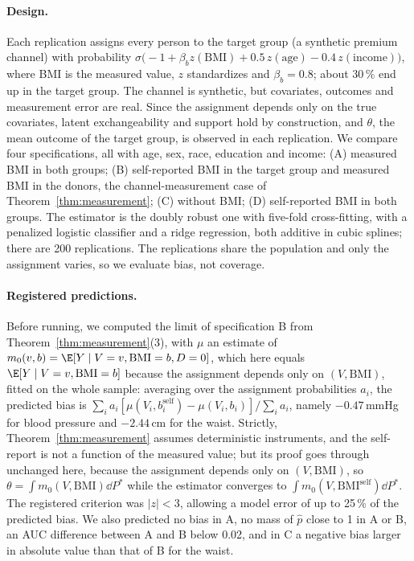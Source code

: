 \paragraph{Design.} Each replication assigns every person to the target group (a synthetic premium channel) with probability $\sigma\bigl(-1+\beta_b z(\mathrm{BMI})+0.5\,z(\mathrm{age})-0.4\,z(\mathrm{income})\bigr)$, where BMI is the measured value, $z$ standardizes and $\beta_b=0.8$; about 30\,\% end up in the target group. The channel is synthetic, but covariates, outcomes and measurement error are real. Since the assignment depends only on the true covariates, latent exchangeability and support hold by construction, and $\theta$, the mean outcome of the target group, is observed in each replication. We compare four specifications, all with age, sex, race, education and income: (A) measured BMI in both groups; (B) self-reported BMI in the target group and measured BMI in the donors, the channel-measurement case of Theorem~\ref{thm:measurement}; (C) without BMI; (D) self-reported BMI in both groups. The estimator is the doubly robust one with five-fold cross-fitting, with a penalized logistic classifier and a ridge regression, both additive in cubic splines; there are 200 replications. The replications share the population and only the assignment varies, so we evaluate bias, not coverage.

\paragraph{Registered predictions.} Before running, we computed the limit of specification B from Theorem~\ref{thm:measurement}(3), with $\mu$ an estimate of $m_0(v,b)=\E[Y\mid V=v,\mathrm{BMI}=b,D=0]$, which here equals $\E[Y\mid V=v,\mathrm{BMI}=b]$ because the assignment depends only on $(V,\mathrm{BMI})$, fitted on the whole sample: averaging over the assignment probabilities $a_i$, the predicted bias is $\sum_ia_i[\mu(V_i,b_i^{\mathrm{self}})-\mu(V_i,b_i)]/\sum_ia_i$, namely $-0.47$\,mmHg for blood pressure and $-2.44$\,cm for the waist. Strictly, Theorem~\ref{thm:measurement} assumes deterministic instruments, and the self-report is not a function of the measured value; but its proof goes through unchanged here, because the assignment depends only on $(V,\mathrm{BMI})$, so $\theta=\int m_0(V,\mathrm{BMI})\dd P^*$ while the estimator converges to $\int m_0(V,\mathrm{BMI}^{\mathrm{self}})\dd P^*$. The registered criterion was $|z|<3$, allowing a model error of up to 25\,\% of the predicted bias. We also predicted no bias in A, no mass of $\hat p$ close to 1 in A or B, an AUC difference between A and B below 0.02, and in C a negative bias larger in absolute value than that of B for the waist.

